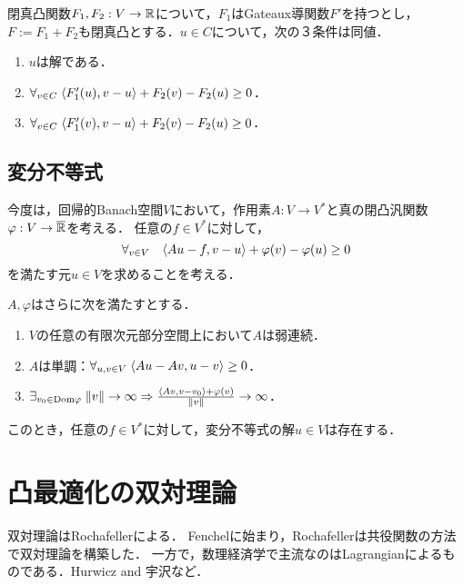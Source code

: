 \documentclass[uplatex,dvipdfmx]{jsreport}
\begin{document}
\begin{proposition}
    閉真凸関数$F_1,F_2:V\to\mathbb{R}$について，$F_1$はGateaux導関数$F'$を持つとし，$F:=F_1+F_2$も閉真凸とする．$u\in C$について，次の３条件は同値．
    \begin{enumerate}
        \item $u$は解である．
        \item $\forall_{v\in C}\;\langle F'_1(u),v-u\rangle+F_2(v)-F_2(u)\ge0$．
        \item $\forall_{v\in C}\;\langle F'_1(v),v-u\rangle+F_2(v)-F_2(u)\ge0$．
    \end{enumerate}
\end{proposition}

\subsection{変分不等式}

\begin{problem}
    今度は，回帰的Banach空間$V$において，作用素$A:V\to V^*$と真の閉凸汎関数$\varphi:V\to\overline{\mathbb{R}}$を考える．
    任意の$f\in V^*$に対して，
    \[\forall_{v\in V}\quad\langle Au-f,v-u\rangle+\varphi(v)-\varphi(u)\ge0\]
    を満たす元$u\in V$を求めることを考える．
\end{problem}

\begin{theorem}
    $A,\varphi$はさらに次を満たすとする．
    \begin{enumerate}
        \item $V$の任意の有限次元部分空間上において$A$は弱連続．
        \item $A$は単調：$\forall_{u,v\in V}\;\langle Au-Av,u-v\rangle\ge0$．
        \item $\exists_{v_0\in\mathrm{Dom}\varphi}\;\|v\|\to\infty\Rightarrow\frac{\langle Av,v-v_0\rangle+\varphi(v)}{\|v\|}\to\infty$．
    \end{enumerate}
    このとき，任意の$f\in V^*$に対して，変分不等式の解$u\in V$は存在する．
\end{theorem}

\section{凸最適化の双対理論}

\begin{tcolorbox}[colframe=ForestGreen, colback=ForestGreen!10!white,breakable,colbacktitle=ForestGreen!40!white,coltitle=black,fonttitle=\bfseries\sffamily,
title=]
    双対理論はRochafellerによる．
    Fenchelに始まり，Rochafellerは共役関数の方法で双対理論を構築した．
    一方で，数理経済学で主流なのはLagrangianによるものである．Hurwicz and 宇沢など．
\end{tcolorbox}
\end{document}
